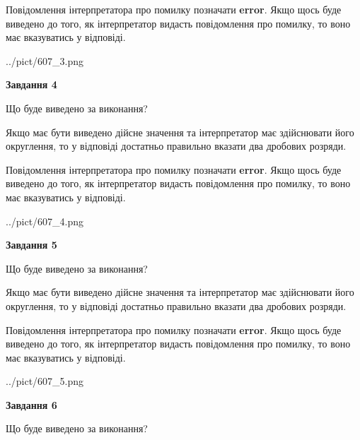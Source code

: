 \documentclass[12pt, ukrainian]{article}
\begin{document}
{\begin {Large}
Повідомлення інтерпретатора про помилку позначати \textbf{error}.
Якщо щось буде виведено до того, як інтерпретатор видасть повідомлення про помилку, 
то воно має вказуватись у відповіді. \par

\begin{center}
	{../pict/607_3.png}
\end{center}
\newpage

{\begin {center}\textbf{Завдання 4}\end {center}}\par
Що буде виведено за виконання? \par

Якщо має бути виведено дійсне значення та інтерпретатор має здійснювати його округлення, 
то у відповіді достатньо правильно вказати два дробових розряди.

Повідомлення інтерпретатора про помилку позначати \textbf{error}.
Якщо щось буде виведено до того, як інтерпретатор видасть повідомлення про помилку, 
то воно має вказуватись у відповіді. \par

\begin{center}
	{../pict/607_4.png}
\end{center}
\newpage

{\begin {center}\textbf{Завдання 5}\end {center}}\par
Що буде виведено за виконання? \par

Якщо має бути виведено дійсне значення та інтерпретатор має здійснювати його округлення, 
то у відповіді достатньо правильно вказати два дробових розряди.

Повідомлення інтерпретатора про помилку позначати \textbf{error}.
Якщо щось буде виведено до того, як інтерпретатор видасть повідомлення про помилку, 
то воно має вказуватись у відповіді. \par

\begin{center}
	{../pict/607_5.png}
\end{center}
\newpage

{\begin {center}\textbf{Завдання 6}\end {center}}\par
Що буде виведено за виконання? \par


\end{Large}}
\end{document}
